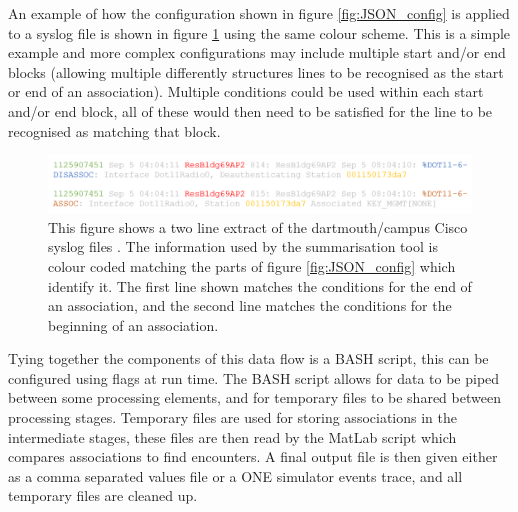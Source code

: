 An example of how the configuration shown in figure \ref{fig:JSON_config} is applied to a syslog file \cite{dartmouthcampus2009syslog} is shown in figure \ref{fig:cisco_syslog} using the same colour scheme. This is a simple example and more complex configurations may include multiple start and/or end blocks (allowing multiple differently structures lines to be recognised as the start or end of an association). Multiple conditions could be used within each start and/or end block, all of these would then need to be satisfied for the line to be recognised as matching that block. 
\begin{figure}[h]
    \centering
    \includegraphics[width=\textwidth]{cisco_coloured.png}
    \caption{This figure shows a two line extract of the dartmouth/campus Cisco syslog files \cite{dartmouthcampus2009syslog}. The information used by the summarisation tool is colour coded matching the parts of figure \ref{fig:JSON_config} which identify it. The first line shown matches the conditions for the end of an association, and the second line matches the conditions for the beginning of an association.}
    \label{fig:cisco_syslog}
\end{figure}
\newline
Tying together the components of this data flow is a BASH script, this can be configured using flags at run time. The BASH script allows for data to be piped between some processing elements, and for temporary files to be shared between processing stages. Temporary files are used for storing associations in the intermediate stages, these files are then read by the MatLab script which compares associations to find encounters. A final output file is then given either as a comma separated values file or a ONE simulator events trace, and all temporary files are cleaned up. 


